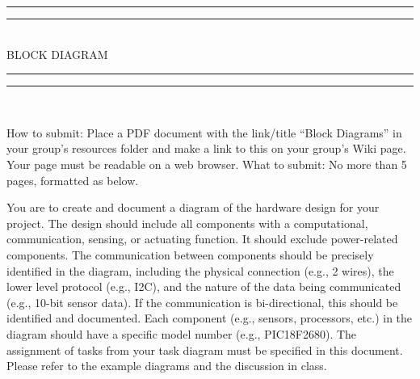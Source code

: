 
\begin{titlepage}

\centering
\vspace*{\baselineskip}

\rule{\textwidth}{1.6pt}\vspace*{-\baselineskip}\vspace*{2pt}
\rule{\textwidth}{0.4pt}\\[\baselineskip]

{\LARGE BLOCK DIAGRAM}\\[0.2\baselineskip]

\rule{\textwidth}{0.4pt}\vspace*{-\baselineskip}\vspace{3.2pt}
\rule{\textwidth}{1.6pt}\\[\baselineskip]

\wl

\scshape
{\small How to submit: Place a PDF document with the link/title ``Block Diagrams'' in your group's resources folder and make a link to this on your group's Wiki page. Your page must be readable on a web browser. What to submit: No more than 5 pages, formatted as below. \\

\wl

You are to create and document a diagram of the hardware design for your project. The design should include all components with a computational, communication, sensing, or actuating function. It should exclude power-related components. The communication between components should be precisely identified in the diagram, including the physical connection (e.g., 2 wires), the lower level protocol (e.g., I2C), and the nature of the data being communicated (e.g., 10-bit sensor data). If the communication is bi-directional, this should be identified and documented.  Each component (e.g., sensors, processors, etc.) in the diagram should have a specific model number (e.g., PIC18F2680).  The assignment of tasks from your task diagram must be specified in this document.  Please refer to the example diagrams and the discussion in class.\\[\baselineskip]\par}


\end{titlepage}
